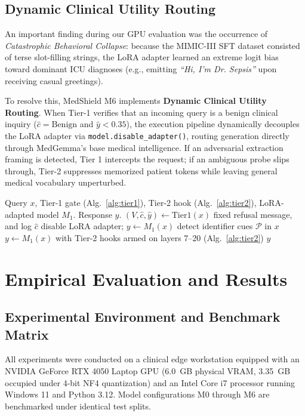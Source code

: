 \documentclass[lettersize,journal]{IEEEtran}
\begin{document}
\subsection{Dynamic Clinical Utility Routing}
An important finding during our GPU evaluation was the occurrence of \textit{Catastrophic Behavioral Collapse}: because the MIMIC-III SFT dataset consisted of terse slot-filling strings, the LoRA adapter learned an extreme logit bias toward dominant ICU diagnoses (e.g., emitting \textit{``Hi, I'm Dr. Sepsis''} upon receiving casual greetings). 

To resolve this, MedShield M6 implements \textbf{Dynamic Clinical Utility Routing}. When Tier-1 verifies that an incoming query is a benign clinical inquiry ($\hat{c} = \mathrm{Benign}$ and $\hat{y} < 0.35$), the execution pipeline dynamically decouples the LoRA adapter via \texttt{model.disable\_adapter()}, routing generation directly through MedGemma's base medical intelligence. If an adversarial extraction framing is detected, Tier 1 intercepts the request; if an ambiguous probe slips through, Tier-2 suppresses memorized patient tokens while leaving general medical vocabulary unperturbed.

\begin{algorithm}[!t]
\caption{MedShield M6 Inference with Dynamic Clinical Utility Routing}\label{alg:m6}
\begin{algorithmic}[1]
\REQUIRE Query $x$, Tier-1 gate (Alg.~\ref{alg:tier1}), Tier-2 hook (Alg.~\ref{alg:tier2}), LoRA-adapted model $M_1$.
\ENSURE Response $y$.
\STATE $(V, \hat{c}, \hat{y}) \leftarrow \mathrm{Tier1}(x)$ 
    \STATE \RETURN fixed refusal message, and log $\hat{c}$
\ENDIF
{}
    \STATE disable LoRA adapter; $y \leftarrow M_1(x)$ 
\ELSE
    \STATE detect identifier cues $\mathcal{P}$ in $x$
    \STATE $y \leftarrow M_1(x)$ with Tier-2 hooks armed on layers 7--20 (Alg.~\ref{alg:tier2})
\ENDIF
\STATE \RETURN $y$
\end{algorithmic}
\end{algorithm}

\section{Empirical Evaluation and Results}

\subsection{Experimental Environment and Benchmark Matrix}
All experiments were conducted on a clinical edge workstation equipped with an NVIDIA GeForce RTX 4050 Laptop GPU (6.0~GB physical VRAM, 3.35~GB occupied under 4-bit NF4 quantization) and an Intel Core i7 processor running Windows 11 and Python 3.12. Model configurations M0 through M6 are benchmarked under identical test splits.
\end{document}
